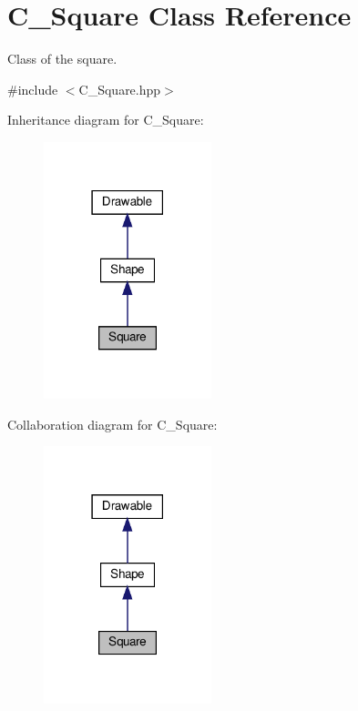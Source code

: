\hypertarget{classSquare}{}\section{C_Square Class Reference}
\label{classSquare}


Class of the square.  




{\ttfamily \#include $<$C_Square.\+hpp$>$}



Inheritance diagram for C_Square\+:\nopagebreak
\begin{figure}[H]
\begin{center}
\leavevmode
\includegraphics[width=138pt]{classSquare__inherit__graph}
\end{center}
\end{figure}


Collaboration diagram for C_Square\+:\nopagebreak
\begin{figure}[H]
\begin{center}
\leavevmode
\includegraphics[width=138pt]{classSquare__coll__graph}
\end{center}
\end{figure}
